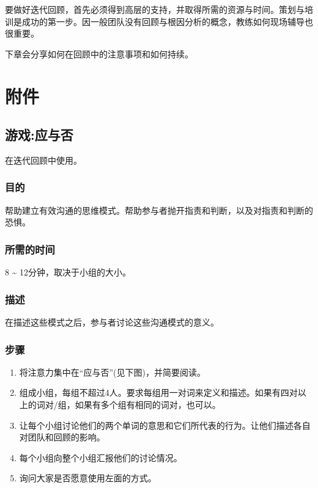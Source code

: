 要做好迭代回顾，首先必须得到高层的支持，并取得所需的资源与时间。策划与培训是成功的第一步。因一般团队没有回顾与根因分析的概念，教练如何现场辅导也很重要。

下章会分享如何在回顾中的注意事项和如何持续。

\hypertarget{ux9644ux4ef6}{%
\section{附件}\label{ux9644ux4ef6}}

\hypertarget{ux6e38ux620fux5e94ux4e0eux5426}{%
\subsection{游戏:应与否}\label{ux6e38ux620fux5e94ux4e0eux5426}}

在迭代回顾中使用。

\hypertarget{ux76eeux7684}{%
\subsubsection{目的}\label{ux76eeux7684}}

帮助建立有效沟通的思维模式。帮助参与者抛开指责和判断，以及对指责和判断的恐惧。

\hypertarget{ux6240ux9700ux7684ux65f6ux95f4}{%
\subsubsection{所需的时间}\label{ux6240ux9700ux7684ux65f6ux95f4}}

8 \textasciitilde{} 12分钟，取决于小组的大小。

\hypertarget{ux63cfux8ff0}{%
\subsubsection{描述}\label{ux63cfux8ff0}}

在描述这些模式之后，参与者讨论这些沟通模式的意义。

\hypertarget{ux6b65ux9aa4}{%
\subsubsection{步骤}\label{ux6b65ux9aa4}}

\begin{enumerate}
\tightlist
\item
  将注意力集中在``应与否''(见下图)，并简要阅读。
\item
  组成小组，每组不超过4人。要求每组用一对词来定义和描述。如果有四对以上的词对/组，如果有多个组有相同的词对，也可以。
\item
  让每个小组讨论他们的两个单词的意思和它们所代表的行为。让他们描述各自对团队和回顾的影响。
\item
  每个小组向整个小组汇报他们的讨论情况。
\item
  询问大家是否愿意使用左面的方式。
\end{enumerate}

